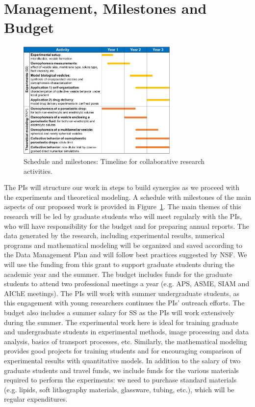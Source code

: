 \documentclass[11pt]{article}
\begin{document}
\section{Management, Milestones and Budget}
\vspace*{-7pt}
\begin{figure}
\vspace*{-15pt}
\centerline{\includegraphics[width=3.1in]{figs/timeline.pdf}}
\vspace*{-8pt}
\caption{\label{fig:ScheduleMilestones} Schedule and milestones:
  Timeline for collaborative research activities.}
\end{figure}
%
The PIs will structure our work in steps to build synergies as we
proceed with the experiments and theoretical modeling. A schedule with
milestones of the main aspects of our proposed work is provided in
Figure~\ref{fig:ScheduleMilestones}. The main themes of this research
will be led by graduate students who will meet regularly with the PIs,
who will have responsibility for the budget and for preparing annual
reports. The data generated by the research, including experimental
results, numerical programs and mathematical modeling will be organized
and saved according to the Data Management Plan and will follow best
practices suggested by NSF. We will use the funding from this grant to
support graduate students during the academic year and the summer. The
budget includes funds for the graduate students to attend two
professional meetings a year (e.g. APS, ASME, SIAM and AIChE meetings).
The PIs will work with summer undergraduate students, as this engagement
with young researchers continues the PIs' outreach efforts. The budget
also includes a summer salary for SS as the PIs will work extensively
during the summer. The experimental work here is ideal for training
graduate and undergraduate students in experimental methods, image
processing and data analysis, basics of transport processes, etc.
Similarly, the mathematical modeling provides good projects for training
students and for encouraging comparison of experimental results with
quantitative models. In addition to the salary of two graduate students
and travel funds, we include funds for the various materials required to
perform the experiments: we need to purchase standard materials (e.g.
lipids, soft lithography materials, glassware, tubing, etc.), which will
be regular expenditures.
\end{document}
